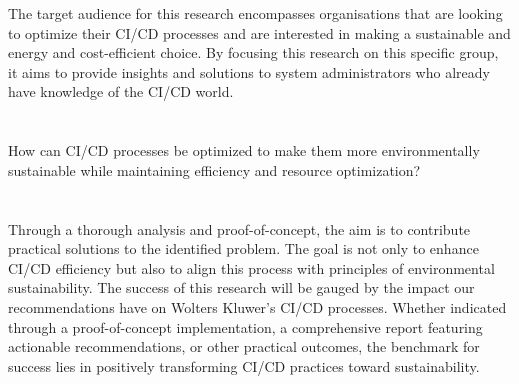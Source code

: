The target audience for this research encompasses organisations that are looking to optimize their CI/CD processes and are interested in making a sustainable and energy and cost-efficient choice.
By focusing this research on this specific group, it aims to provide insights and solutions to system administrators who already have knowledge of the CI/CD world.


\section{}%
\label{sec:onderzoeksvraag}

How can CI/CD processes be optimized to make them more environmentally sustainable while maintaining efficiency
and resource optimization?


\section{}%
\label{sec:onderzoeksdoelstelling}

Through a thorough analysis and proof-of-concept, the aim is to contribute practical solutions to the identified problem.
The goal is not only to enhance CI/CD efficiency but also to align this process with principles of environmental sustainability.
The success of this research will be gauged by the impact our recommendations have on Wolters Kluwer's CI/CD processes. 
Whether indicated through a proof-of-concept implementation, a comprehensive report featuring actionable recommendations, or other practical outcomes, the benchmark for success lies in positively transforming CI/CD practices toward sustainability.


\section{}%
\label{sec:opzet-bachelorproef}

